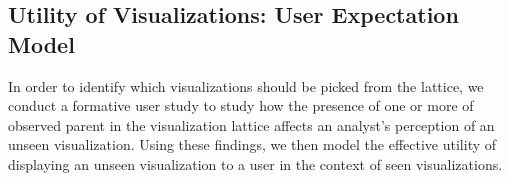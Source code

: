 
\subsection{Utility of Visualizations: User Expectation Model\label{sec:utility}}
In order to identify which visualizations should be picked from the lattice, we conduct a formative user study
to study how the presence of one or more of observed parent in the visualization lattice affects an analyst's perception of an unseen visualization. Using these findings, we then model the effective utility of displaying an unseen visualization to a user in the context of seen visualizations.%

